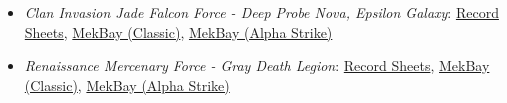 \begin{itemize}
\item \emph{Clan Invasion Jade Falcon Force - Deep Probe Nova, Epsilon Galaxy}: \href{https://raw.githubusercontent.com/Eudicods/outworlds-wastes/rules-pdf/jade-falcon.pdf}{Record Sheets}, \href{https://mekbay.com/?units=Outworlds%20Wastes~BMMadCat_B,BMGrendel_C,BMBlackHawk_D,BMPuma_E,AFHammerhead_HMRHDb,AFVandal_Prime,BAElementalBattleArmor_LaserSqd5,BAElementalBattleArmor_LaserSqd5,BAElementalBattleArmor_MGSqd5,BAElementalBattleArmor_MGSqd5&name=Deep%20Probe%20Nova,%20Epsilon%20Galaxy&gs=cbt}{MekBay (Classic)}, \href{https://mekbay.com/?units=Outworlds%20Wastes~BMMadCat_B,BMGrendel_C,BMBlackHawk_D,BMPuma_E,AFHammerhead_HMRHDb,AFVandal_Prime,BAElementalBattleArmor_LaserSqd5,BAElementalBattleArmor_LaserSqd5,BAElementalBattleArmor_MGSqd5,BAElementalBattleArmor_MGSqd5&name=Deep%20Probe%20Nova,%20Epsilon%20Galaxy&gs=as}{MekBay (Alpha Strike)}

\item \emph{Renaissance Mercenary Force - Gray Death Legion}: \href{https://raw.githubusercontent.com/Eudicods/outworlds-wastes/rules-pdf/gray-death.pdf}{Record Sheets}, \href{https://mekbay.com/?units=Outworlds%20Wastes~BMShadowHawk_SHD2H:3:4,BMWolverine_WVR6R:3:4,BMLocust_LCT1V,BMRifleman_RFL3N:3:4,BMStinger_STG3G,BMWasp_WSP1A,BMWasp_WSP1A,AFChippewa_CHPW5,AFChippewa_CHPW5,CVGalleonLightTank_GAL100,CVGalleonLightTank_GAL100,CVArmoredPersonnelCarrier_Hover,CVArmoredPersonnelCarrier_Hover,CIFootPlatoonAntiMech_Flamer,CIFootPlatoonAntiMech_MG&name=Gray%20Death%20Legion&gs=cbt}{MekBay (Classic)}, \href{https://mekbay.com/?units=Outworlds%20Wastes~BMShadowHawk_SHD2H:3:4,BMWolverine_WVR6R:3:4,BMLocust_LCT1V,BMRifleman_RFL3N:3:4,BMStinger_STG3G,BMWasp_WSP1A,BMWasp_WSP1A,AFChippewa_CHPW5,AFChippewa_CHPW5,CVGalleonLightTank_GAL100,CVGalleonLightTank_GAL100,CVArmoredPersonnelCarrier_Hover,CVArmoredPersonnelCarrier_Hover,CIFootPlatoonAntiMech_Flamer,CIFootPlatoonAntiMech_MG&name=Gray%20Death%20Legion&gs=as}{MekBay (Alpha Strike)}


\end{itemize}
